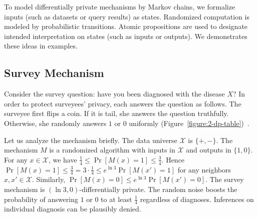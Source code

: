 To model differentially private mechanisms by Markov chains, we
formalize inputs (such as datasets or query results) as states. 
Randomized computation is modeled by probabilistic transitions. Atomic
propositions are used to designate intended interpretation on states
(such as inputs or outputs). We demonstrates these ideas in examples.


\subsection{Survey Mechanism}
\label{subsec:survey}

Consider the survey question: have you been diagnosed
with the disease $X$? In order to protect surveyees' privacy, each
answers the question as follows. The surveyee first flips a
coin. If it is tail, she answers the question truthfully. Otherwise,
she randomly answers $1$ or $0$
uniformly (Figure~\ref{figure:2-dp-table})~\cite{DR:14:AFDP}.

Let us analyze the mechanism briefly. The data universe $\mathcal{X}$
is $\{ +, - \}$. The mechanism $M$ is a randomized algorithm with
inputs in $\mathcal{X}$ and outputs in $\{ 1, 0 \}$. For any $x \in
\mathcal{X}$, we have $\frac{1}{4} \leq \Pr[M (x) = 1] \leq
\frac{3}{4}$. Hence $\Pr[M (x) = 1] \leq \frac{3}{4} = 3 \cdot
\frac{1}{4} \leq e^{\ln 3} \Pr[M (x') = 1]$ for any neighbors $x, x'
\in \mathcal{X}$. Similarly, $\Pr[M (x) = 0] \leq e^{\ln 3} \Pr[M (x')
= 0]$. The survey mechanism is $(\ln 3, 0)$-differentially private.
The random noise boosts the probability of answering
$1$ or $0$ to at least $\frac{1}{4}$ regardless of
diagnoses. Inferences on individual diagnosis can be plausibly denied.

